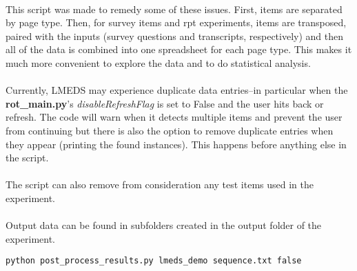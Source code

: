 \paragraph{}
This script was made to remedy some of these issues.  First, items are separated by page type.  Then, for survey items and rpt experiments, items are transposed, paired with the inputs (survey questions and transcripts, respectively) and then all of the data is combined into one spreadsheet for each page type.  This makes it much more convenient to explore the data and to do statistical analysis.

\paragraph{}
Currently, LMEDS may experience duplicate data entries--in particular when the \textbf{rot\_main.py}'s \textit{disableRefreshFlag} is set to False and the user hits back or refresh.  The code will warn when it detects multiple items and prevent the user from continuing but there is also the option to remove duplicate entries when they appear (printing the found instances).  This happens before anything else in the script.

\paragraph{}
The script can also remove from consideration any test items used in the experiment.

\paragraph{}
Output data can be found in subfolders created in the output folder of the experiment.

\begin{lstlisting}
python post_process_results.py lmeds_demo sequence.txt false
\end{lstlisting}


